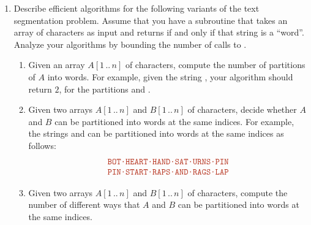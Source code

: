 \begin{enumerate}[label=\arabic*.,ref=\thechapter.\arabic*,leftmargin=*,align=left,widest*=99,itemsep=1.5ex plus 0.5ex]
\item Describe efficient algorithms for the following variants of the text segmentation problem.
Assume that you have a subroutine  that takes an array of characters as input and returns  if and only if that string is a “word”.
Analyze your algorithms by bounding the number of calls to .
\begin{enumerate}
\item Given an array $A[1\,..\,n]$ of characters, compute the number of partitions of $A$ into words.
For example, given the string , your algorithm should return $2$, for the partitions  and .
\item Given two arrays $A[1\,..\,n]$ and $B[1\,..\,n]$ of characters, decide whether $A$ and $B$ can be partitioned into words at the same indices.
For example, the strings  and  can be partitioned into words at the same indices as follows:
\[
\begin{array}{c}
\mbox{\Str{BOT·HEART·HAND·SAT·URNS·PIN}}\\
\mbox{\Str{PIN·START·RAPS·AND·RAGS·LAP}}
\end{array}
\]
\item Given two arrays $A[1\,..\,n]$ and $B[1\,..\,n]$ of characters, compute the number of different ways that $A$ and $B$ can be partitioned into words at the same indices.
\end{enumerate}


\end{enumerate}
